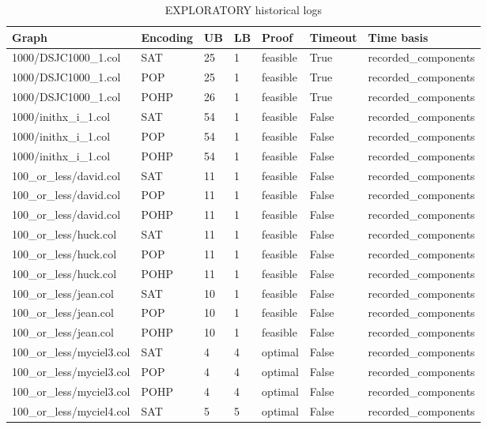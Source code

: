 \begin{table}[htbp]
\centering
\caption{EXPLORATORY historical logs}
\label{tab:p1-Repeated-exploratory-results}
\begin{tabular}{lllllll}
\hline
Graph & Encoding & UB & LB & Proof & Timeout & Time basis \\
\hline
1000/DSJC1000\_1.col & SAT & 25 & 1 & feasible & True & recorded\_components \\
1000/DSJC1000\_1.col & POP & 25 & 1 & feasible & True & recorded\_components \\
1000/DSJC1000\_1.col & POHP & 26 & 1 & feasible & True & recorded\_components \\
1000/inithx\_i\_1.col & SAT & 54 & 1 & feasible & False & recorded\_components \\
1000/inithx\_i\_1.col & POP & 54 & 1 & feasible & False & recorded\_components \\
1000/inithx\_i\_1.col & POHP & 54 & 1 & feasible & False & recorded\_components \\
100\_or\_less/david.col & SAT & 11 & 1 & feasible & False & recorded\_components \\
100\_or\_less/david.col & POP & 11 & 1 & feasible & False & recorded\_components \\
100\_or\_less/david.col & POHP & 11 & 1 & feasible & False & recorded\_components \\
100\_or\_less/huck.col & SAT & 11 & 1 & feasible & False & recorded\_components \\
100\_or\_less/huck.col & POP & 11 & 1 & feasible & False & recorded\_components \\
100\_or\_less/huck.col & POHP & 11 & 1 & feasible & False & recorded\_components \\
100\_or\_less/jean.col & SAT & 10 & 1 & feasible & False & recorded\_components \\
100\_or\_less/jean.col & POP & 10 & 1 & feasible & False & recorded\_components \\
100\_or\_less/jean.col & POHP & 10 & 1 & feasible & False & recorded\_components \\
100\_or\_less/myciel3.col & SAT & 4 & 4 & optimal & False & recorded\_components \\
100\_or\_less/myciel3.col & POP & 4 & 4 & optimal & False & recorded\_components \\
100\_or\_less/myciel3.col & POHP & 4 & 4 & optimal & False & recorded\_components \\
100\_or\_less/myciel4.col & SAT & 5 & 5 & optimal & False & recorded\_components \\

\end{tabular}
\end{table}

